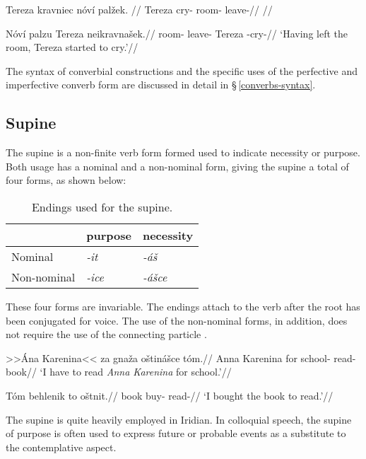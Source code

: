 \pex
\begingl
\gla Tereza kravniec nóví palžek. //
\glb Tereza cry- room- leave-//
\glft {}//
\endgl
\xe

\pex
\begingl
\gla Nóví palzu Tereza neikravnašek.//
\glb room- leave- Tereza -cry-//
\glft `Having left the room, Tereza started to cry.'//
\endgl
\xe

The syntax of converbial constructions and the specific uses of the perfective and imperfective converb form are discussed in detail in \S\,\ref{converbs-syntax}.


\subsection{Supine}

The {\sc supine} is a non-finite verb form formed used to indicate necessity or purpose. Both usage has a nominal and a non-nominal form, giving the supine a total of four forms, as shown below:

\begin{table}[h!]
	\small
	\caption{Endings used for the supine.}
	\medskip
	\begin{tabu} to 0.6\textwidth{YYY}
		\toprule
		&{\sc purpose}&{\sc necessity}\\
		\midrule
		Nominal & \textit{-it} & \textit{-áš}\\
		Non-nominal & \textit{-ice} & \textit{-ášce}\\
		\bottomrule
	\end{tabu}
\end{table}

These four forms are invariable. The endings attach to the verb after the root has been conjugated for voice. The use of the non-nominal forms, in addition, does not require the use of the connecting particle .

\pex
\a\begingl
\gla >>Ána Karenina<< za gnaža oštinášce tóm.//
\glb Anna Karenina for school- read- book//
\glft `I have to read \textit{Anna Karenina} for school.'//
\endgl

\a\begingl
\gla Tóm behlenik to oštnit.//
\glb book buy-  read-//
\glft `I bought the book to read.'//
\endgl
\xe

The supine is quite heavily employed in Iridian. In colloquial speech, the supine of purpose is often used to express future or probable events as a substitute to the contemplative aspect.

